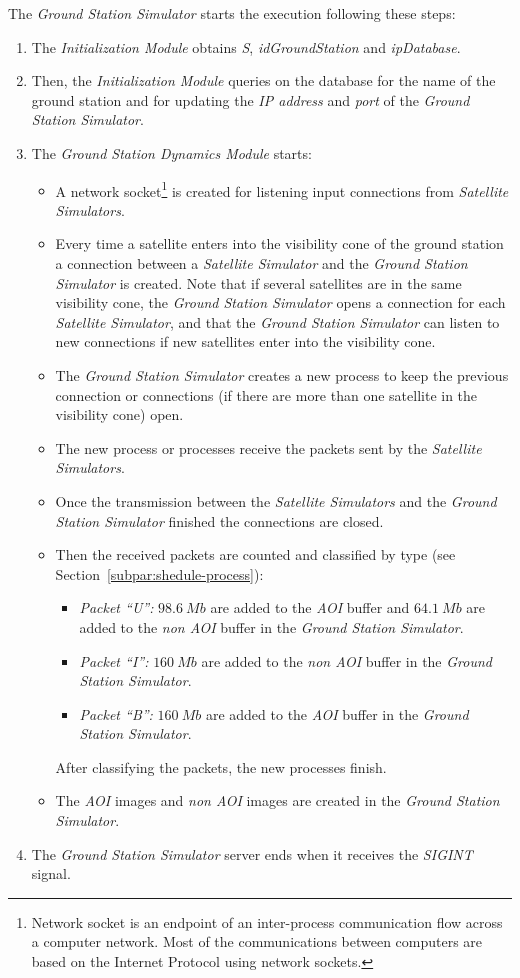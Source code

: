 The \emph{Ground Station Simulator} starts the execution following these steps:
\begin{enumerate}
\item The \emph{Initialization Module} obtains \emph{S}, \emph{idGroundStation} and \emph{ipDatabase}.
\item Then, the \emph{Initialization Module} queries on the database for the
  name of the ground station and for updating the \emph{IP address} and
  \emph{port} of the \emph{Ground Station Simulator}.
\item The \emph{Ground Station Dynamics Module} starts:
\begin{itemize}
\item A network socket\footnote{Network socket is an endpoint of an inter-process communication flow across a computer network. Most of the communications between computers are based on the Internet Protocol using network sockets.}  is created for listening input connections from \emph{Satellite Simulators}.
\item Every time a satellite enters into the visibility cone of the ground station a connection between a \emph{Satellite Simulator} and the \emph{Ground Station Simulator} is created. Note that if several satellites are in the same visibility cone, the \emph{Ground Station Simulator} opens a connection for each \emph{Satellite Simulator}, and that the \emph{Ground Station Simulator} can listen to new connections if new satellites enter into the visibility cone.
\item The \emph{Ground Station Simulator} creates a new process to keep the previous connection or connections (if there are more than one satellite in the visibility cone) open.
\item The new process or processes receive the packets sent by the \emph{Satellite Simulators}.
\item Once the transmission between the \emph{Satellite Simulators} and the \emph{Ground Station Simulator} finished the connections are closed.
\item Then the received packets are counted and classified by type (see Section~\ref{subpar:shedule-process}):
\begin{itemize}
\item \emph{Packet ``U'':} $98.6~Mb$ are added to the \emph{AOI} buffer and $64.1~Mb$ are added to the \emph{non AOI} buffer in the \emph{Ground Station Simulator}.
\item \emph{Packet ``I'':} $160~Mb$ are added to the \emph{non AOI} buffer in the \emph{Ground Station Simulator}.
\item \emph{Packet ``B'':} $160~Mb$ are added to the \emph{AOI} buffer in the
  \emph{Ground   Station Simulator}.
\end{itemize}
After classifying the packets, the new processes finish.
\item The \emph{AOI} images and \emph{non AOI} images are created in the \emph{Ground Station  Simulator}.
\end{itemize}
\item The \emph{Ground Station Simulator} server ends when it receives the \emph{SIGINT} signal.
\end{enumerate}

